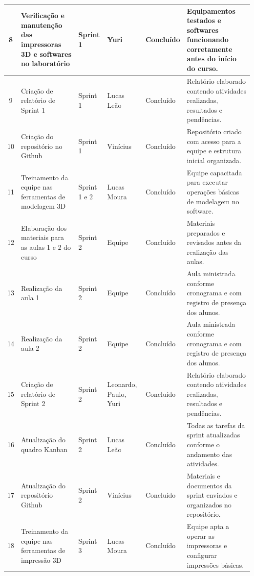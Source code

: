 \documentclass[12pt,a4paper]{article}
\begin{document}
\begin{longtable}{|c|p{3.8cm}|p{1.9cm}|p{2.2cm}|p{1.7cm}|p{4.2cm}|}
8 & Verificação e manutenção das impressoras 3D e softwares no laboratório & Sprint 1 & Yuri & Concluído & Equipamentos testados e softwares funcionando corretamente antes do início do curso. \\ \hline

9 & Criação de relatório de Sprint 1 & Sprint 1 & Lucas Leão & Concluído & Relatório elaborado contendo atividades realizadas, resultados e pendências. \\ \hline

10 & Criação do repositório no Github & Sprint 1 & Vinícius & Concluído & Repositório criado com acesso para a equipe e estrutura inicial organizada. \\ \hline

11 & Treinamento da equipe nas ferramentas de modelagem 3D & Sprint 1 e 2 & Lucas Moura & Concluído & Equipe capacitada para executar operações básicas de modelagem no software. \\ \hline

12 & Elaboração dos materiais para as aulas 1 e 2 do curso & Sprint 2 & Equipe & Concluído & Materiais preparados e revisados antes da realização das aulas. \\ \hline

13 & Realização da aula 1 & Sprint 2 & Equipe & Concluído & Aula ministrada conforme cronograma e com registro de presença dos alunos. \\ \hline

14 & Realização da aula 2 & Sprint 2 & Equipe & Concluído & Aula ministrada conforme cronograma e com registro de presença dos alunos. \\ \hline

15 & Criação de relatório de Sprint 2 & Sprint 2 & Leonardo, Paulo, Yuri & Concluído & Relatório elaborado contendo atividades realizadas, resultados e pendências. \\ \hline

16 & Atualização do quadro Kanban & Sprint 2 & Lucas Leão & Concluído & Todas as tarefas da sprint atualizadas conforme o andamento das atividades. \\ \hline

17 & Atualização do repositório Github & Sprint 2 & Vinícius & Concluído & Materiais e documentos da sprint enviados e organizados no repositório. \\ \hline

18 & Treinamento da equipe nas ferramentas de impressão 3D & Sprint 3 & Lucas Moura & Concluído & Equipe apta a operar as impressoras e configurar impressões básicas. \\ \hline


\end{longtable}
\end{document}
